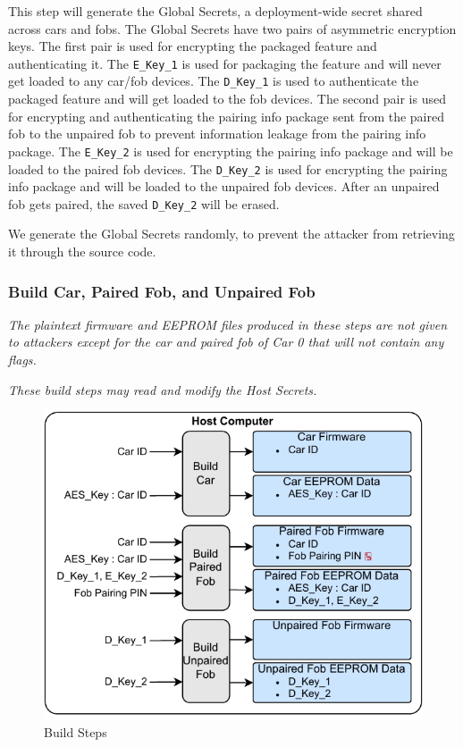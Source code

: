 \documentclass[11pt,oneside,onecolumn,letterpaper]{article}
\begin{document}
This step will generate the Global Secrets, a deployment-wide secret shared across cars and fobs.
The Global Secrets have two pairs of asymmetric encryption keys.
The first pair is used for encrypting the packaged feature and authenticating it.
The \verb|E_Key_1| is used for packaging the feature and will never get loaded to any car/fob devices.
The \verb|D_Key_1| is used to authenticate the packaged feature and will get loaded to the fob devices.
The second pair is used for encrypting and authenticating the pairing info package sent from the paired fob to the unpaired fob to prevent information leakage from the pairing info package.
The \verb|E_Key_2| is used for encrypting the pairing info package and will be loaded to the paired fob devices.
The \verb|D_Key_2| is used for encrypting the pairing info package and will be loaded to the unpaired fob devices.
After an unpaired fob gets paired, the saved \verb|D_Key_2| will be erased.

We generate the Global Secrets randomly, to prevent the attacker from retrieving it through the source code.

\subsubsection{Build Car, Paired Fob, and Unpaired Fob}

\textit{The plaintext firmware and EEPROM files produced in these steps are not given to attackers except for the car and paired fob of Car 0 that will not contain any flags.}

\textit{These build steps may read and modify the Host Secrets.}

\begin{figure}[!htbp]
	\begin{centering}
		\includegraphics[width = .6\textwidth]{pic/build_step.pdf}
		\caption{Build Steps}
		\label{fig:build_step}
	\end{centering}
\end{figure}
\end{document}
